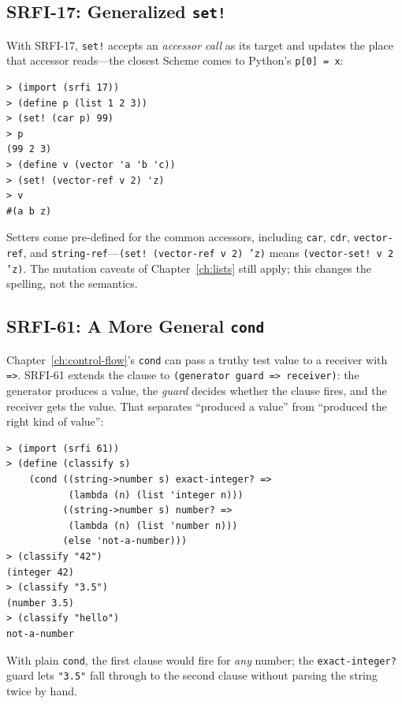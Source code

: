 \subsection{SRFI-17: Generalized \texttt{set!}}

With SRFI-17, \texttt{set!} accepts an \emph{accessor call} as its target and updates the place that accessor reads---the closest Scheme comes to Python's \texttt{p[0] = x}:

\begin{lstlisting}[style=repl]
> (import (srfi 17))
> (define p (list 1 2 3))
> (set! (car p) 99)
> p
(99 2 3)
> (define v (vector 'a 'b 'c))
> (set! (vector-ref v 2) 'z)
> v
#(a b z)
\end{lstlisting}

Setters come pre-defined for the common accessors, including \texttt{car}, \texttt{cdr}, \texttt{vector-ref}, and \texttt{string-ref}---\texttt{(set! (vector-ref v 2) 'z)} means \texttt{(vector-set! v 2 'z)}. The mutation caveats of Chapter~\ref{ch:lists} still apply; this changes the spelling, not the semantics.

\subsection{SRFI-61: A More General \texttt{cond}}

Chapter~\ref{ch:control-flow}'s \texttt{cond} can pass a truthy test value to a receiver with \texttt{=>}. SRFI-61 extends the clause to \texttt{(generator guard => receiver)}: the generator produces a value, the \emph{guard} decides whether the clause fires, and the receiver gets the value. That separates ``produced a value'' from ``produced the right kind of value'':

\begin{lstlisting}[style=repl]
> (import (srfi 61))
> (define (classify s)
    (cond ((string->number s) exact-integer? =>
           (lambda (n) (list 'integer n)))
          ((string->number s) number? =>
           (lambda (n) (list 'number n)))
          (else 'not-a-number)))
> (classify "42")
(integer 42)
> (classify "3.5")
(number 3.5)
> (classify "hello")
not-a-number
\end{lstlisting}

With plain \texttt{cond}, the first clause would fire for \emph{any} number; the \texttt{exact-integer?} guard lets \texttt{"3.5"} fall through to the second clause without parsing the string twice by hand.

